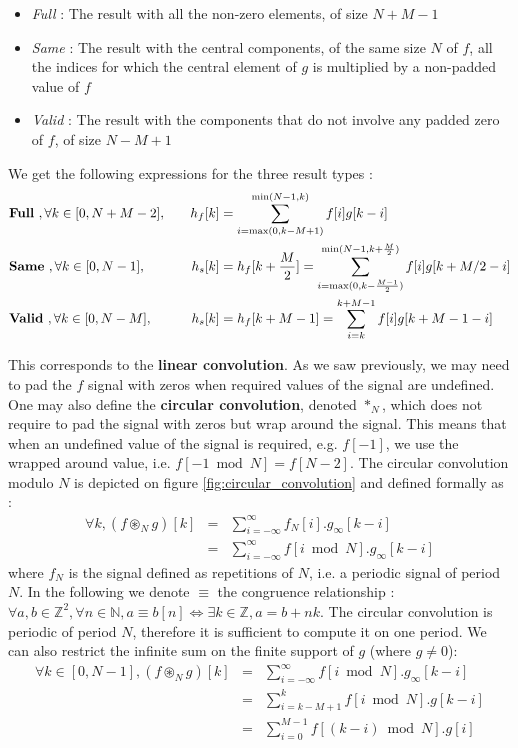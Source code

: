 \documentclass[a4paper,10pt,twoside]{article}
\begin{document}
\begin{itemize}
\item \emph{Full} : The result with all the non-zero elements, of size $N+M-1$
\item \emph{Same} : The result with the central components, of the same size $N$ of $f$, all the indices for which the central element of $g$ is multiplied by a non-padded value of $f$
\item \emph{Valid} : The result with the components that do not involve any padded zero of $f$, of size $N-M+1$
\end{itemize}
We get the following expressions for the three result types :\\
\begin{alignat}{3}
\label{eq:linear_convolution_full} &\mbox{\textbf{Full} }, \forall k \in [0,N+M-2], \quad & h_f[k] & = \sum_{i=\max(0,k-M+1)}^{\min(N-1,k)} f[i] g[k-i] \\
\label{eq:linear_convolution_same} &\mbox{\textbf{Same} }, \forall k \in [0,N-1], \quad & h_s[k] & = h_f[k+\frac{M}{2}] = \sum_{i=\max(0,k-\frac{M-1}{2})}^{\min(N-1,k+\frac{M}{2})} f[i] g[k+M/2-i] \\
\label{eq:linear_convolution_valid} &\mbox{\textbf{Valid} }, \forall k \in [0,N-M], \quad & h_s[k] & = h_f[k+M-1] = \sum_{i=k}^{k+M-1} f[i] g[k+M-1-i] 
\end{alignat}

This corresponds to the \textbf{linear convolution}. As we saw previously, we may need to pad the $f$ signal with zeros when required values of the signal are undefined. One may also define the \textbf{circular convolution}, denoted $*_N$, which does not require to pad the signal with zeros but wrap around the signal. This means that when an undefined value of the signal is required, e.g. $f[-1]$, we use the wrapped around value, i.e. $f[-1\bmod N] = f[N-2]$. The circular convolution modulo $N$ is depicted on figure \ref{fig:circular_convolution} and defined formally as :
\begin{eqnarray}
\nonumber \forall k, (f \circledast_N g)[k] &=& \sum_{i=-\infty}^{\infty} f_N[i] . g_\infty[k - i]\\
				  &=& \sum_{i=-\infty}^{\infty} f[i\bmod N] . g_\infty[k - i]
\end{eqnarray}
where $f_N$ is the signal defined as repetitions of $N$, i.e. a periodic signal of period $N$. In the following we denote $\equiv$ the congruence relationship : $\forall a,b \in \mathbb{Z}^2, \forall n \in \mathbb{N}, a \equiv b [n] \Leftrightarrow \exists k \in \mathbb{Z}, a = b + n k$. The circular convolution is periodic of period $N$, therefore it is sufficient to compute it on one period. We can also restrict the infinite sum on the finite support of $g$ (where $g \neq 0$):
\begin{eqnarray}
\nonumber \forall k \in [0,N-1], (f \circledast_N g)[k] &=& \sum_{i=-\infty}^{\infty} f[i\bmod N] . g_\infty[k - i]\\
\nonumber        					&=& \sum_{i=k-M+1}^{k} f[i \bmod N].g[k-i] \\
\label{eq:circular_convolution}				&=& \sum_{i=0}^{M-1} f[(k-i) \bmod N].g[i]
\end{eqnarray}
\end{document}
